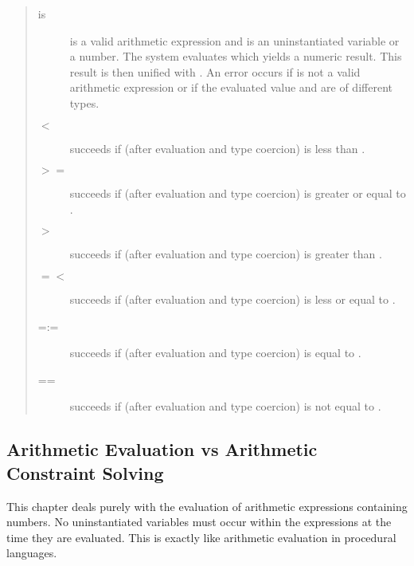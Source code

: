 \begin{quote}
\begin{description}
\item[ is ]
 is a valid arithmetic expression and 
is an uninstantiated variable or a number.
The system evaluates  which yields a numeric result.
This result is then unified with .
An error occurs if  is not a valid arithmetic expression or
if the evaluated value and  are of different types.

\item[ $<$ ]
succeeds if (after evaluation and type coercion)  is less than
.

\item[ $>=$ ]
succeeds if (after evaluation and type coercion)  is greater or
equal to .

\item[ $>$ ]
succeeds if (after evaluation and type coercion)  is greater than
.

\item[ $=<$ ]
succeeds if (after evaluation and type coercion)  is less or equal
to .

\item[ =:= ]
succeeds if (after evaluation and type coercion)  is equal to
.

\item[ =\bsl= ]%
succeeds if (after evaluation and type coercion)  is not equal to
.
\end{description}
\end{quote}


\subsection{Arithmetic Evaluation vs Arithmetic Constraint Solving}

This chapter deals purely with the evaluation of arithmetic expressions
containing numbers. No uninstantiated variables must occur within the
expressions at the time they are evaluated. This is exactly like
arithmetic evaluation in procedural languages.

